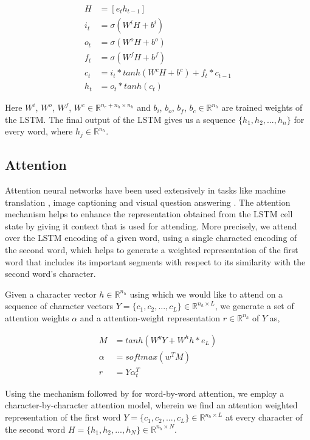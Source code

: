 \documentclass[11pt,letterpaper]{article}
\begin{document}
\begin{align}
H &= [e_t h_{t-1}] \\
i_t &= \sigma (W^iH + b^i) \\
o_t &= \sigma (W^oH + b^o) \\
f_t &= \sigma (W^fH + b^f) \\
c_t &= i_t * tanh(W^cH + b^c) + f_t * c_{t-1} \\
h_t &= o_t * tanh(c_t)
\end{align}

Here $W^i$, $W^o$, $W^f$, $W^c \in  \mathbb{R}^{n_e+n_h \times n_h}$ and $b_i$, $b_o$, $b_f$, $b_c \in \mathbb{R}^{n_h}$ are trained weights of the LSTM. The final output of the LSTM gives us a sequence $\{h_1, h_2, ..., h_n\}$ for every word, where $h_j \in \mathbb{R}^{n_h}$.

\subsection{Attention}

Attention neural networks have been used extensively in tasks like machine translation \cite{mtattention}, image captioning \cite{cpattention} and visual question answering \cite{stackedattention}. The attention mechanism helps to enhance the representation obtained from the LSTM cell state by giving it context that is used for attending. More precisely, we attend over the LSTM encoding of a given word, using a single characted encoding of the second word, which helps to generate a weighted representation of the first word that includes its important segments with respect to its similarity with the second word's character. 

Given a character vector $h \in  \mathbb{R}^{n_h}$ using which we would like to attend on a sequence of character vectors $Y = \{c_1, c_2, ..., c_L\} \in \mathbb{R}^{n_h \times L}$, we generate a set of attention weights $\alpha$ and a attention-weight representation $r \in  \mathbb{R}^{n_h}$ of $Y$ as,

\begin{align}
M &= tanh(W^yY + W^hh*e_L) \\
\alpha &= softmax(w^TM) \\
r &= Y\alpha_t^T
\end{align}

Using the mechanism followed by \cite{rocktaschel2016reasoning} for word-by-word attention, we employ a character-by-character attention model, wherein we find an attention weighted representation of the first word $Y = \{c_1, c_2, ..., c_L\} \in \mathbb{R}^{n_h \times L}$ at every character of the second word $H = \{h_1, h_2, ..., h_N\} \in \mathbb{R}^{n_h \times N}$.
\end{document}
